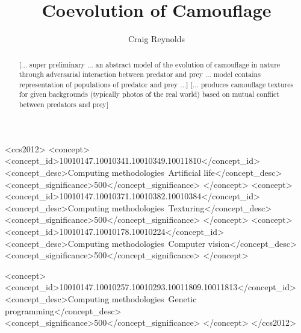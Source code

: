 \documentclass[sigconf]{acmart}
\begin{document}
\title{Coevolution of Camouflage}

\author{Craig Reynolds}

\renewcommand{\shortauthors}{Craig Reynolds}

\begin{abstract}
  [... super preliminary ... an abstract model of the evolution of camouflage in nature through adversarial interaction between predator and prey ... model contains representation of populations of predator and prey ...]
  [... produces camouflage textures for given backgrounds (typically photos of the real world) based on mutual conflict between predators and prey]
\end{abstract}

\begin{CCSXML}
<ccs2012>
   <concept>
       <concept_id>10010147.10010341.10010349.10011810</concept_id>
       <concept_desc>Computing methodologies~Artificial life</concept_desc>
       <concept_significance>500</concept_significance>
       </concept>
   <concept>
       <concept_id>10010147.10010371.10010382.10010384</concept_id>
       <concept_desc>Computing methodologies~Texturing</concept_desc>
       <concept_significance>500</concept_significance>
       </concept>
   <concept>
       <concept_id>10010147.10010178.10010224</concept_id>
       <concept_desc>Computing methodologies~Computer vision</concept_desc>
       <concept_significance>500</concept_significance>
       </concept>
    
    <concept>
        <concept_id>10010147.10010257.10010293.10011809.10011813</concept_id>
        <concept_desc>Computing methodologies~Genetic programming</concept_desc>
        <concept_significance>500</concept_significance>
    </concept>
 </ccs2012>
\end{CCSXML}


\end{document}
